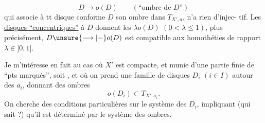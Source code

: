 \[
D\longrightarrow o(D)\qquad (\text{``ombre de $D$''})
\]
qui associe à tt disque conforme 
$D$ son ombre dans $T_{X',a}$, n'a rien d'injec-
tif. Les \uline{disques ``concentriques''} à $D$
donnent les $\lambda o(D)$ $(0<\lambda\leq1)$, plus
précisément, $D\unsure{\longrightarrow|-}o(D)$ est compatible aux
homothéties de rapport  $\lambda\in]0,1]$.

Je m'intéresse en fait au cas
où $X'$ est compacte, et munie d'une
 partie finie de ``pts marqués'', soit
, et où on prend une famille
de disques $D_i$ $(i\in I)$  autour des $a_i$,
donnant des ombres
\[
o(D_i)\subset T_{X',a_i}.
\]
On cherche des conditions particulières
 sur le système des $D_i$, impliquant
(qui sait ?) qu'il est déterminé par
le système des ombres.
